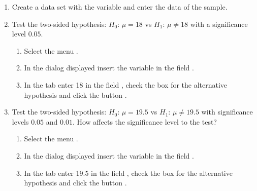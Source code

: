 \begin{enumerate}[leftmargin=*]
\begin{enumerate}
\item Create a data set with the variable  and enter the data of the sample.

\item Test the two-sided hypothesis: $H_0$: $\mu=18$ vs $H_1$: $\mu\neq18$ with a significance level $0.05$.
\begin{indication}
\begin{enumerate}
\item Select the menu .
\item In the dialog displayed insert the variable  in the field .
\item In the  tab enter 18 in the field , check the box 
for the alternative hypothesis and click the button .
\end{enumerate}
\end{indication}

\item Test the two-sided hypothesis: $H_0$: $\mu=19.5$ vs $H_1$: $\mu\neq19.5$ with significance levels $0.05$ and
$0.01$.
How affects the significance level to the test?

\begin{indication}
\begin{enumerate}
\item Select the menu .
\item In the dialog displayed insert the variable  in the field .
\item In the  tab enter 19.5 in the field , check the box 
for the alternative hypothesis and click the button .
\end{enumerate}
\end{indication}


\end{enumerate}
\end{enumerate}

